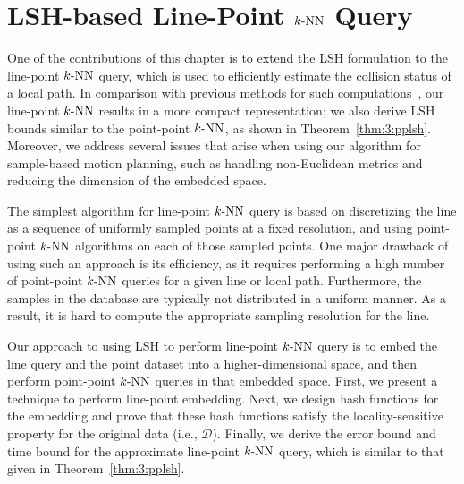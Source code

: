 \section{LSH-based Line-Point $k\text{-NN}$ Query}
\label{sec:3:linelsh}
One of the contributions of this chapter is to extend the LSH formulation to the line-point $k\text{-NN}$ query, which is used to efficiently estimate the collision status of a local path. In comparison with previous methods for such computations~\cite{Andoni:2009:ALN,Basri:2011}, our line-point $k\text{-NN}$ results in a more compact representation; we also derive LSH bounds similar to the point-point $k\text{-NN}$, as shown in Theorem~\ref{thm:3:pplsh}. Moreover, we address several issues that arise when using our algorithm for sample-based motion planning, such as handling non-Euclidean metrics and reducing the dimension of the embedded space.

The simplest algorithm for line-point $k\text{-NN}$ query is based on discretizing the line as a sequence of uniformly sampled points at a fixed resolution, and using point-point $k\text{-NN}$ algorithms on each of those sampled points. One major drawback of using such an approach is its efficiency, as it requires performing a high number of point-point $k\text{-NN}$ queries for a given line or local path. Furthermore, the samples in the database are typically not distributed in a uniform manner. As a result, it is hard to compute the appropriate sampling resolution for the line.

Our approach to using LSH to perform line-point $k\text{-NN}$ query is to embed the line query and the point dataset into a higher-dimensional space, and then perform point-point $k\text{-NN}$ queries in that embedded space. First, we present a technique to perform line-point embedding. Next, we design hash functions for the embedding and prove that these hash functions satisfy the locality-sensitive property for the original data (i.e., $\mathcal D$). Finally, we derive the error bound and time bound for the approximate line-point $k\text{-NN}$ query, which is similar to that given in Theorem~\ref{thm:3:pplsh}.

